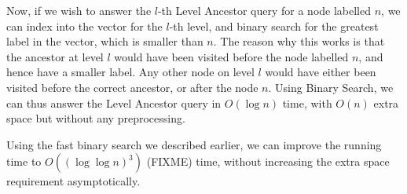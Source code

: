 \documentclass{article}
\begin{document}
Now, if we wish to answer the $l$-th Level Ancestor query for a node labelled $n$,
we can index into the vector for the $l$-th level, and binary search for the 
greatest label in the vector, which is smaller than $n$. The reason why this 
works is that the ancestor at level $l$ would have been visited before the node 
labelled $n$, and hence have a smaller label. Any other node on level $l$ would have
either been visited before the correct ancestor, or after the node $n$. Using
Binary Search, we can thus answer the Level Ancestor query in $O(\log{n})$ time, 
with $O(n)$ extra space but without any preprocessing. 

Using the fast binary search we described earlier, we can improve the running 
time to $O((\log{\log{n}})^3)$ (FIXME) time, without increasing the extra space
requirement asymptotically.
\end{document}
